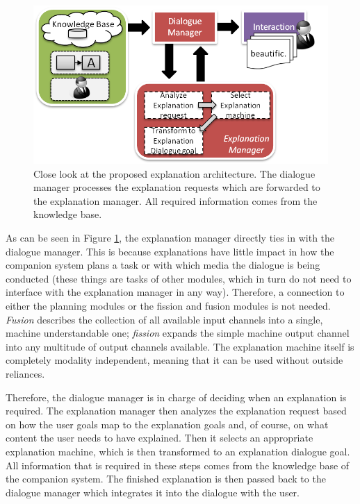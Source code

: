 \documentclass[a4paper]{article}
\begin{document}
\begin{figure}[H]
	\centering
	\includegraphics[width=12cm]{expl_arch.png}
	\caption{Close look at the proposed explanation architecture. The dialogue manager processes the explanation requests which are forwarded to the explanation manager. All required information comes from the knowledge base.}
	\label{fig:expl_architecture}
\end{figure}

As can be seen in Figure \ref{fig:expl_architecture}, the explanation manager directly ties in with the dialogue manager. This is because explanations have little impact in how the companion system plans a task or with which media the dialogue is being conducted (these things are tasks of other modules, which in turn do not need to interface with the explanation manager in any way). Therefore, a connection to either the planning modules or the fission and fusion modules is not needed. {\it Fusion} describes the collection of all available input channels into a single, machine understandable one; {\it fission} expands the simple machine output channel into any multitude of output channels available. The explanation machine itself is completely modality independent, meaning that it can be used without outside reliances.

Therefore, the dialogue manager is in charge of deciding when an explanation is required. The explanation manager then analyzes the explanation request based on how the user goals map to the explanation goals and, of course, on what content the user needs to have explained. Then it selects an appropriate explanation machine, which is then transformed to an explanation dialogue goal. All information that is required in these steps comes from the knowledge base of the companion system. The finished explanation is then passed back to the dialogue manager which integrates it into the dialogue with the user.
\end{document}
